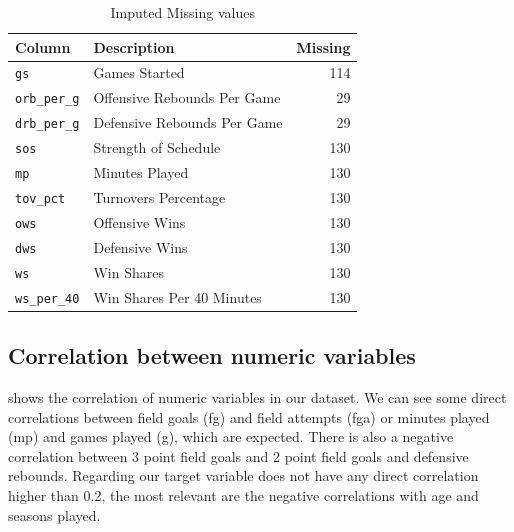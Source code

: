 \begin{table}[htb]
  \centering
  \caption{Imputed Missing values}%
  \label{tab:missing-values}
  \begin{tabular}{llr}
    \toprule
    \textbf{Column} & \textbf{Description} & \textbf{Missing} \\
    \midrule
    \texttt{gs}          & Games Started               & 114 \\
    \texttt{orb\_per\_g} & Offensive Rebounds Per Game & 29  \\
    \texttt{drb\_per\_g} & Defensive Rebounds Per Game & 29  \\
    \texttt{sos}         & Strength of Schedule        & 130 \\
    \texttt{mp}          & Minutes Played              & 130 \\
    \texttt{tov\_pct}    & Turnovers Percentage        & 130 \\
    \texttt{ows}         & Offensive Wins              & 130 \\
    \texttt{dws}         & Defensive Wins              & 130 \\
    \texttt{ws}          & Win Shares                  & 130 \\
    \texttt{ws\_per\_40} & Win Shares Per 40 Minutes   & 130 \\
    \bottomrule
  \end{tabular}
\end{table}


\subsection{Correlation between numeric variables}%
\label{sub:numeric-corr}

 shows the correlation of numeric variables in our dataset. We can see some direct
correlations between field goals (fg) and field attempts (fga) or
minutes played (mp) and games played (g),
which are expected.
There is also a negative correlation between 3 point field goals and 2 point field goals
and defensive rebounds. Regarding our target variable does not have any direct correlation higher than 0.2,
the most relevant are the negative correlations with age and seasons played.

